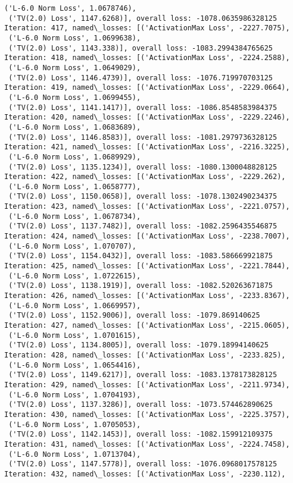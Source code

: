 \documentclass[10pt]{article}
\begin{document}
\begin{Verbatim}[commandchars=\\\{\}]
 ('L-6.0 Norm Loss', 1.0678746),
 ('TV(2.0) Loss', 1147.6268)], overall loss: -1078.0635986328125
Iteration: 417, named\_losses: [('ActivationMax Loss', -2227.7075),
 ('L-6.0 Norm Loss', 1.0699638),
 ('TV(2.0) Loss', 1143.338)], overall loss: -1083.2994384765625
Iteration: 418, named\_losses: [('ActivationMax Loss', -2224.2588),
 ('L-6.0 Norm Loss', 1.0649029),
 ('TV(2.0) Loss', 1146.4739)], overall loss: -1076.719970703125
Iteration: 419, named\_losses: [('ActivationMax Loss', -2229.0664),
 ('L-6.0 Norm Loss', 1.0699455),
 ('TV(2.0) Loss', 1141.1417)], overall loss: -1086.8548583984375
Iteration: 420, named\_losses: [('ActivationMax Loss', -2229.2246),
 ('L-6.0 Norm Loss', 1.0683689),
 ('TV(2.0) Loss', 1146.8583)], overall loss: -1081.2979736328125
Iteration: 421, named\_losses: [('ActivationMax Loss', -2216.3225),
 ('L-6.0 Norm Loss', 1.0689929),
 ('TV(2.0) Loss', 1135.1234)], overall loss: -1080.1300048828125
Iteration: 422, named\_losses: [('ActivationMax Loss', -2229.262),
 ('L-6.0 Norm Loss', 1.0658777),
 ('TV(2.0) Loss', 1150.0658)], overall loss: -1078.1302490234375
Iteration: 423, named\_losses: [('ActivationMax Loss', -2221.0757),
 ('L-6.0 Norm Loss', 1.0678734),
 ('TV(2.0) Loss', 1137.7482)], overall loss: -1082.2596435546875
Iteration: 424, named\_losses: [('ActivationMax Loss', -2238.7007),
 ('L-6.0 Norm Loss', 1.070707),
 ('TV(2.0) Loss', 1154.0432)], overall loss: -1083.586669921875
Iteration: 425, named\_losses: [('ActivationMax Loss', -2221.7844),
 ('L-6.0 Norm Loss', 1.0722615),
 ('TV(2.0) Loss', 1138.1919)], overall loss: -1082.520263671875
Iteration: 426, named\_losses: [('ActivationMax Loss', -2233.8367),
 ('L-6.0 Norm Loss', 1.0669957),
 ('TV(2.0) Loss', 1152.9006)], overall loss: -1079.869140625
Iteration: 427, named\_losses: [('ActivationMax Loss', -2215.0605),
 ('L-6.0 Norm Loss', 1.0701615),
 ('TV(2.0) Loss', 1134.8005)], overall loss: -1079.18994140625
Iteration: 428, named\_losses: [('ActivationMax Loss', -2233.825),
 ('L-6.0 Norm Loss', 1.0654416),
 ('TV(2.0) Loss', 1149.6217)], overall loss: -1083.1378173828125
Iteration: 429, named\_losses: [('ActivationMax Loss', -2211.9734),
 ('L-6.0 Norm Loss', 1.0704193),
 ('TV(2.0) Loss', 1137.3286)], overall loss: -1073.574462890625
Iteration: 430, named\_losses: [('ActivationMax Loss', -2225.3757),
 ('L-6.0 Norm Loss', 1.0705053),
 ('TV(2.0) Loss', 1142.1453)], overall loss: -1082.159912109375
Iteration: 431, named\_losses: [('ActivationMax Loss', -2224.7458),
 ('L-6.0 Norm Loss', 1.0713704),
 ('TV(2.0) Loss', 1147.5778)], overall loss: -1076.0968017578125
Iteration: 432, named\_losses: [('ActivationMax Loss', -2230.112),

\end{Verbatim}
\end{document}
